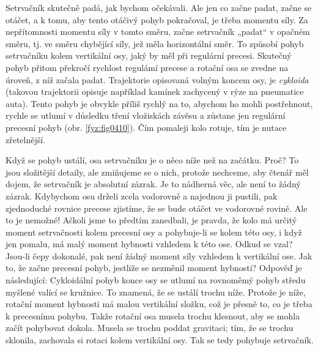     Setrvačník skutečně padá, jak bychom očekávali. Ale jen co začne padat, začne se otáčet, a k
    tomu, aby tento otáčivý pohyb pokračoval, je třeba momentu síly. Za nepřítomnosti momentu síly v
    tomto směru, začne setrvačník „padat“ v opačném směru, tj. ve směru chybějící síly, jež měla
    horizontální směr. To způsobí pohyb setrvačníku kolem vertikální osy, jaký by měl při regulární
    precesi. Skutečný pohyb přitom překročí rychlost regulámí precese a rotační osa se zvedne na
    úroveň, z níž začala padat. Trajektorie opisovaná volným koncem osy, je \emph{cykloida} (takovou
    trajektorii opisuje například kamínek zachycený v rýze na pneumatice auta). Tento pohyb je
    obvykle příliš rychlý na to, abychom ho mohli postřehnout, rychle se utlumí v důsledku tření
    vložiskách závěsu a zůstane jen regulární precesní pohyb (obr. \ref{fyz:fig0410}). Čím pomaleji
    kolo rotuje, tím je nutace zřetelnější.

    Když se pohyb ustálí, osa setrvačníku je o něco níže než na začátku. Proč? To jsou složitější
    detaily, ale zmiňujeme se o nich, protože nechceme, aby čtenář měl dojem, že setrvačník je
    absolutní zázrak. Je to nádherná věc, ale není to žádný zázrak. Kdybychom osu drželi zcela
    vodorovně a najednou ji pustili, pak zjednoduché rovnice precese zjistíme, že se bude otáčet ve
    vodorovné rovině. Ale to je nemožné! Ačkoli jsme to předtím zanedbali, je pravda, že kolo má
    určitý moment setrvačnosti kolem precesní osy a pohybuje-li se kolem této osy, i když jen
    pomalu, má malý moment hybnosti vzhledem k této ose. Odkud se vzal? Jsou-li čepy dokonalé, pak
    není žádný moment síly vzhledem k vertikální ose. Jak to, že začne precesní pohyb, jestliže se
    nezměnil moment hybnosti? Odpověď je následující: Cykloidální pohyb konce osy se utlumí na
    rovnoměmý pohyb středu myšlené valící se kružnice. To znamená, že se ustálí trochu níže. Protože
    je níže, rotační moment hybnosti má malou vertikální složku, což je přesně to, co je třeba k
    precesnímu pohybu. Takže rotační osa musela trochu klesnout, aby se mohla začít pohybovat
    dokola. Musela se trochu poddat gravitaci; tím, že se trochu sklonila, zachovala si rotaci kolem
    vertikální osy. Tak se tedy pohybuje setrvačník.

